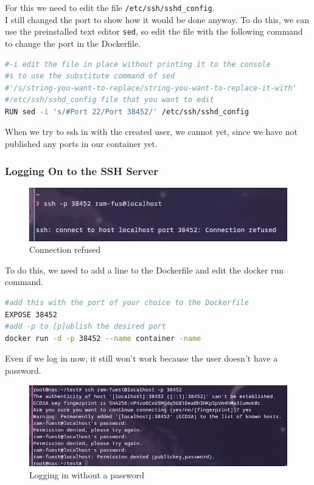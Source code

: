 \documentclass[a4paper]{article}
\begin{document}
For this we need to edit the file \texttt{/etc/ssh/sshd\_config}. \\
I still changed the port to show how it would be done anyway.
To do this, we can use the preinstalled text editor \texttt{sed}, so edit the file with the following command to change the port in the Dockerfile.
\begin{lstlisting}[language=bash]
#-i edit the file in place without printing it to the console
#s to use the substitute command of sed
#'/s/string-you-want-to-replace/string-you-want-to-replace-it-with'
#/etc/ssh/sshd_config file that you want to edit
RUN sed -i 's/#Port 22/Port 38452/' /etc/ssh/sshd_config
\end{lstlisting}
When we try to ssh in with the created user, we cannot yet, since we have not published any ports in our container yet.
\subsubsection{Logging On to the SSH Server}
\begin{figure}[h]
	\centering
	\includegraphics[scale=0.4]{images/loggingin-before-expsing-the-port.png}
	\caption{Connection refused}
\end{figure} 
To do this, we need to add a line to the Dockerfile and edit the docker run command.
\begin{lstlisting}[language=bash]
#add this with the port of your choice to the Dockerfile
EXPOSE 38452
#add -p to [p]ublish the desired port
docker run -d -p 38452 --name container -name
\end{lstlisting}
Even if we log in now, it still won't work because the user doesn't have a password.
\begin{figure}[h]
	\centering
	\includegraphics[scale=0.4]{images/failingtologin.png}
	\caption{Logging in without a password}
\end{figure} \\
\end{document}
